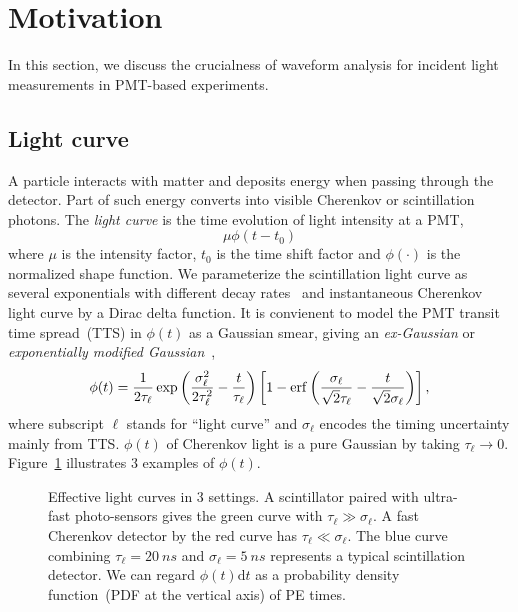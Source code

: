 \section{Motivation}
\label{sec:toyMC}

In this section, we discuss the crucialness of waveform analysis for incident light measurements in PMT-based experiments.

\subsection{Light curve}
A particle interacts with matter and deposits energy when passing through the detector. Part of such energy converts into visible Cherenkov or scintillation photons. The \textit{light curve} is the time evolution of light intensity at a PMT,
\begin{equation}
  \label{eq:light-curve}
  \mu\phi(t-t_0)
\end{equation}
where $\mu$ is the intensity factor, $t_0$ is the time shift factor and $\phi(\cdot)$ is the normalized shape function. We parameterize the scintillation light curve as several exponentials with different decay rates~\cite{rebber_particle_2021} and instantaneous Cherenkov light curve by a Dirac delta function.  It is convienent to model the PMT transit time spread~(TTS) in $\phi(t)$ as a Gaussian smear, giving an \textit{ex-Gaussian} or \textit{exponentially modified Gaussian}~\cite{li_separation_2016},
\begin{align}
    \phi(t) = \frac{1}{2\tau_\ell} \exp\left(\frac{\sigma_\ell^2}{2\tau_\ell^2}-\frac{t}{\tau_\ell}\right) \left[1 - \operatorname{erf}\left( \frac{\sigma_\ell}{\sqrt{2}\tau_\ell} - \frac{t}{\sqrt{2}\sigma_\ell} \right)\right],
    \label{eq:time-pro}
\end{align}
where subscript $\ell$ stands for ``light curve'' and $\sigma_\ell$ encodes the timing uncertainty mainly from TTS. $\phi(t)$ of Cherenkov light is a pure Gaussian by taking $\tau_\ell \rightarrow 0$. Figure~\ref{fig:time-pro} illustrates 3 examples of $\phi(t)$. 

\begin{figure}[!htb]
  \centering
  \resizebox{0.5\textwidth}{!}{}
  \caption{\label{fig:time-pro} Effective light curves in 3 settings.  A scintillator paired with ultra-fast photo-sensors gives the green curve with $\tau_\ell \gg \sigma_\ell$.  A fast Cherenkov detector by the red curve has $\tau_\ell \ll \sigma_\ell$.  The blue curve combining $\tau_\ell=\SI{20}{ns}$ and $\sigma_\ell=\SI{5}{ns}$ represents a typical scintillation detector.  We can regard $\phi(t)\mathrm{d}t$ as a probability density function~(PDF at the vertical axis) of PE times.}
\end{figure}


